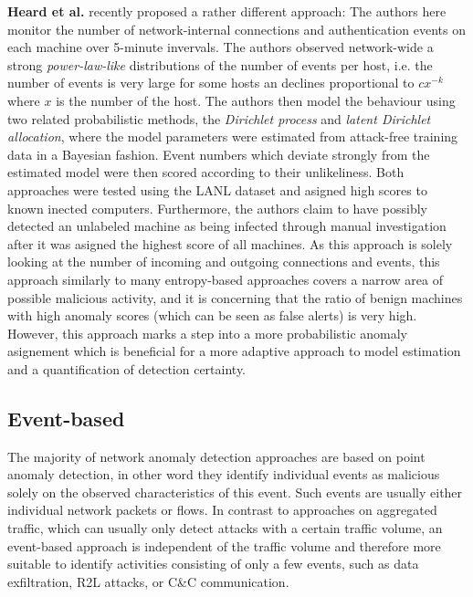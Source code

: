 \documentclass[a4paper,12pt,twoside]{report}
\begin{document}
\textbf{Heard et al.} \cite{heard2016network, heard2016topic} recently proposed a rather different approach: The authors here monitor the number of network-internal connections and authentication events on each machine over 5-minute invervals. The authors observed network-wide a strong \textit{power-law-like} distributions of the number of events per host, i.e. the number of events is very large for some hosts an declines proportional to $c x^{-k}$ where $x$ is the number of the host. The authors then model the behaviour using two related probabilistic methods, the \textit{Dirichlet process} and \textit{latent Dirichlet allocation}, where the model parameters were estimated from attack-free training data in a Bayesian fashion. Event numbers which deviate strongly from the estimated model were then scored according to their unlikeliness. Both approaches were tested using the LANL dataset and asigned high scores to known inected computers. Furthermore, the authors claim to have possibly detected an unlabeled machine as being infected through manual investigation after it was asigned the highest score of all machines. As this approach is solely looking at the number of incoming and outgoing connections and events, this approach similarly to many entropy-based approaches covers a narrow area of possible malicious activity, and it is concerning that the ratio of benign machines with high anomaly scores (which can be seen as false alerts) is very high. However, this approach marks a step into a more probabilistic anomaly asignement which is beneficial for a more adaptive approach to model estimation and a quantification of detection certainty.





\subsection{Event-based}

The majority of network anomaly detection approaches are based on point anomaly detection, in other word they identify individual events as malicious solely on the observed characteristics of this event. Such events are usually either individual network packets or flows. In contrast to approaches on aggregated traffic, which can usually only detect attacks with a certain traffic volume, an event-based approach is independent of the traffic volume and therefore more suitable to identify activities consisting of only a few events, such as data exfiltration, R2L attacks, or C\&C communication.
\end{document}
